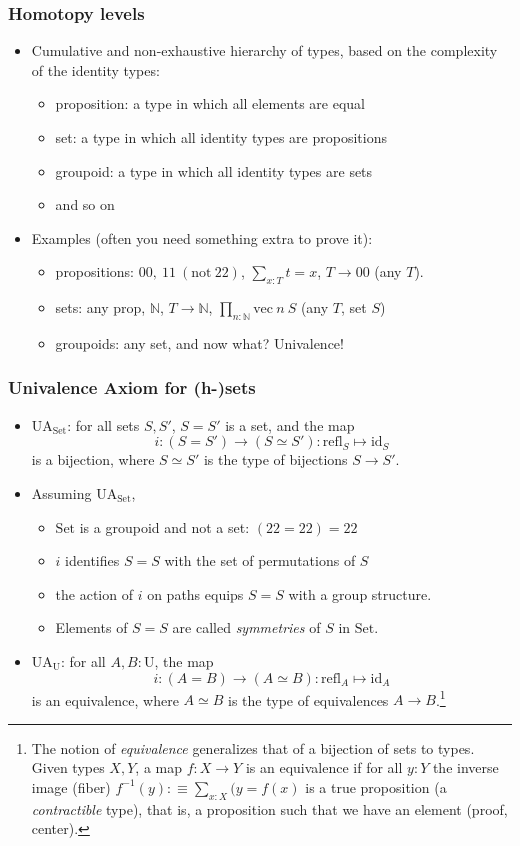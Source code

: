 \documentclass[handout,11pt]{beamer}
\newcommand{\UU}{\mathrm{U}}
\newcommand{\defeq}{:\equiv}
\newcommand{\refl}{\mathrm{refl}}
\newcommand{\Set}{\mathrm{Set}}
\newcommand{\UA}{\mathrm{UA}}
\newcommand{\NN}{\mathbb{N}}
\newcommand{\bn}[1]{{{#1\!\!\!#1}}}
\newcommand{\id}{\mathrm{id}}
\newcommand{\vectype}[2]{\mathrm{vec}~#1~#2}
\begin{document}
\begin{frame}%
\frametitle{Homotopy levels}
\begin{itemize}[<+->]
\item Cumulative and non-exhaustive hierarchy of types,
based on the complexity of the identity types:\begin{itemize}[<+->]
\item proposition: a type in which all elements are equal
\item set: a type in which all identity types are propositions
\item groupoid: a type in which all identity types are sets
\item and so on
\end{itemize}
\item
Examples (often you need something extra to prove it):
\begin{itemize}[<+->]
\item propositions: $\bn{0},~\bn{1}~(\text{not}~\bn{2})$, 
$\sum_{x:T} t=x$, $T\to\bn0$ \quad(any $T$).
\item sets: any prop, $\NN$, $T\to\NN$, $\prod_{n:\NN} \vectype n S$ 
\quad(any $T$, set $S$)
\item groupoids: any set, and now what?  Univalence!
\end{itemize}
\end{itemize}

\end{frame}

\begin{frame}
\frametitle{Univalence Axiom for (h-)sets}
\begin{itemize}[<+->]
\item $\UA_{\Set}$: for all sets $S,S'$, $S=S'$ is a set, and the map
$$i: (S=S') \to (S\simeq S'): \refl_S\mapsto \id_S$$
is a bijection, where $S\simeq S'$ is the type of bijections $S\to S'$.
\item Assuming $\UA_{\Set}$,
\begin{itemize}[<+->]
\item $\Set$ is a groupoid and not a set: $(\bn2=\bn2)=\bn2$
\item $i$ identifies $S=S$ with the set of permutations of $S$
\item the action of $i$ on paths equips $S=S$ with a group structure.
\item Elements of $S=S$ are called \emph{symmetries} of $S$ in $\Set$.
\end{itemize}
\item $\UA_\UU$: for all $A,B:\UU$, the map
$$i: (A=B) \to (A\simeq B): \refl_A\mapsto \id_A$$ is an equivalence,
where $A\simeq B$ is the type of equivalences $A\to B$.\footnote{%
The notion of \emph{equivalence} generalizes that of a bijection of sets 
to types. Given types $X,Y$, a map $f:X\to Y$ is an equivalence if for 
all $y:Y$ the inverse image (fiber) 
$f^{-1}(y)\defeq\sum_{x:X}(y=f(x)$ is a true proposition
(a \emph{contractible} type), that is, a proposition such that 
we have an element (proof, center).}
\end{itemize}
\vspace*{1cm}          
\end{frame}
\end{document}
